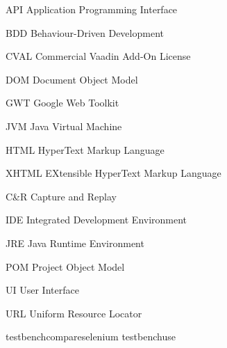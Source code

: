 \documentclass[12pt,a4paper,english%
]{tutthesis}
\begin{document}
\begin{termlist}
\item [API] Application Programming Interface
\item [BDD] Behaviour-Driven Development
\item [CVAL] Commercial Vaadin Add-On License
\item [DOM] Document Object Model
\item [GWT] Google Web Toolkit
\item [JVM] Java Virtual Machine
\item [HTML] HyperText Markup Language
\item [XHTML] EXtensible HyperText Markup Language
\item [C\&R]Capture and Replay
\item [IDE] Integrated Development Environment
\item [JRE] Java Runtime Environment
\item [POM] Project Object Model
\item [UI] User Interface
\item [URL] Uniform Resource Locator

\end{termlist} 


\cleardoublepage

\newpage             %
\setcounter{page}{1} %
\renewcommand{\chaptername}{} %




 




 {testbenchcompareselenium}
 {testbenchuse}  
\end{document}
